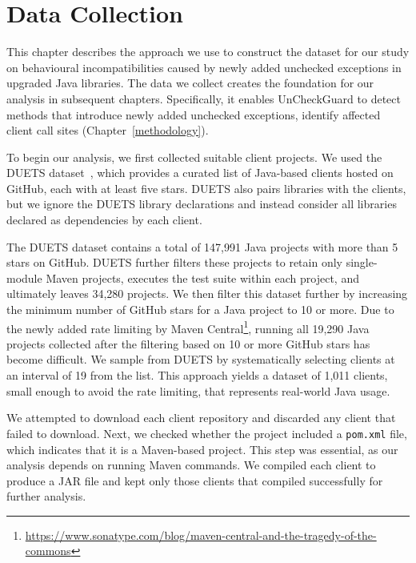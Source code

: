 \chapter{Data Collection}\label{data}

This chapter describes the approach we use to construct the dataset for our study on behavioural incompatibilities caused by newly added unchecked exceptions in upgraded Java libraries. The data we collect creates the foundation for our analysis in subsequent chapters. Specifically, it enables UnCheckGuard to detect methods that introduce newly added unchecked exceptions, identify affected client call sites (Chapter~\ref{methodology}).


To begin our analysis, we first collected suitable client projects. We used the DUETS dataset~\cite{durieux21:_duets}, which provides a curated list of Java-based clients hosted on GitHub, each with at least five stars. DUETS also pairs libraries with the clients, but we ignore the DUETS library declarations and instead consider all libraries declared as dependencies by each client.

The DUETS dataset contains a total of 147,991 Java projects with more than 5 stars on GitHub. DUETS further filters these projects to retain only single-module Maven projects, executes the test suite within each project, and ultimately leaves 34,280 projects. We then filter this dataset further by increasing the minimum number of GitHub stars for a Java project to 10 or more. Due to the newly added rate limiting by Maven Central\footnote{\tiny \url{https://www.sonatype.com/blog/maven-central-and-the-tragedy-of-the-commons}}, running all 19,290 Java projects collected after the filtering based on 10 or more GitHub stars has become difficult. We sample from DUETS by systematically selecting clients at an interval of 19 from the list. This approach yields a dataset of 1,011 clients, small enough to avoid the rate limiting, that represents real-world Java usage.

We attempted to download each client repository and discarded any client that failed to download.
Next, we checked whether the project included a \texttt{pom.xml} file, which indicates that it is a Maven-based project. This step was essential, as our analysis depends on running Maven commands. We compiled each client to produce a JAR file and kept only those clients that compiled successfully for further analysis.